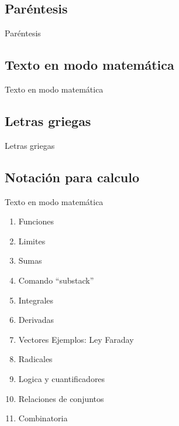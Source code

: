 \documentclass[../slides.tex]{subfiles}
\begin{document}
    \subsection{Paréntesis}

    \begin{frame}{Paréntesis}
    \end{frame}
    
    \subsection{Texto en modo matemática}
    
    \begin{frame}{Texto en modo matemática}
    \end{frame}        
    
    \subsection{Letras griegas}

    \begin{frame}{Letras griegas}
    \end{frame} 
    
    \subsection{Notación para calculo}

    \begin{frame}{Texto en modo matemática}
    \end{frame}
        \begin{enumerate}
        \item{Funciones}
        \item{Limites}
        \item{Sumas}
            \item{Comando ``substack''}
        \item{Integrales}
        \item{Derivadas}
        \item{Vectores}
            Ejemplos: Ley Faraday
    
        \item{Radicales}
        
        \item{Logica y cuantificadores}
        
        \item{Relaciones de conjuntos}
        
        \item{Combinatoria} 
        \end{enumerate}
\end{document}
